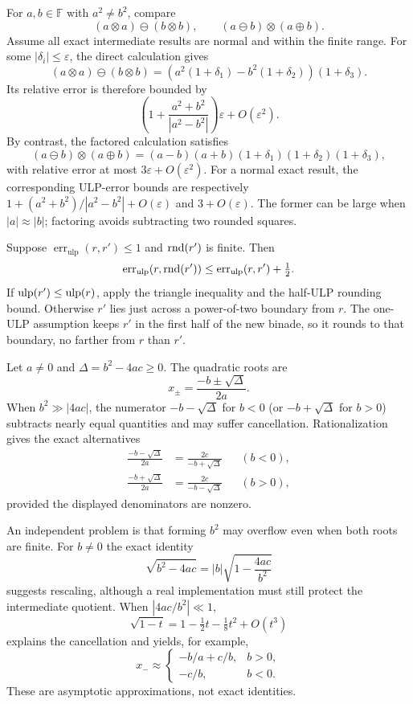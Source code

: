\begin{example}
For $a, b\in\mathbb F$ with $a^2\ne b^2$, compare
\[
 (a\otimes a)\ominus(b\otimes b),
 \qquad (a\ominus b)\otimes(a\oplus b).
\]
Assume all exact intermediate results are normal and within the
finite range. For some $|\delta_i|\le\varepsilon$, the direct
calculation gives
\[
 (a\otimes a)\ominus(b\otimes b)
 =(a^2(1+\delta_1)-b^2(1+\delta_2))(1+\delta_3).
\]
Its relative error is therefore bounded by
\[
 \left(1+\frac{a^2+b^2}{|a^2-b^2|}\right)\varepsilon
 +O(\varepsilon^2).
\]
By contrast, the factored calculation satisfies
\[
 (a\ominus b)\otimes(a\oplus b)
 =(a-b)(a+b)(1+\delta_1)(1+\delta_2)(1+\delta_3),
\]
with relative error at most $3\varepsilon+O(\varepsilon^2)$.
For a normal exact result, the corresponding ULP-error bounds
are respectively $1+(a^2+b^2)/|a^2-b^2|+O(\varepsilon)$
and $3+O(\varepsilon)$. The former can be large when
$|a|\approx|b|$; factoring avoids subtracting two rounded squares.
\end{example}

\begin{remark}
Suppose $\operatorname{err}_{\mathrm{ulp}}(r, r')\le1$
and $\operatorname{rnd}(r')$ is finite. Then
\[
 \operatorname{err}_{\mathrm{ulp}}(r, \operatorname{rnd}(r'))
 \le\operatorname{err}_{\mathrm{ulp}}(r, r')+\tfrac12.
\]
If $\operatorname{ulp}(r')\le\operatorname{ulp}(r)$, apply the triangle inequality and the
half-ULP rounding bound. Otherwise $r'$ lies just across a
power-of-two boundary from $r$. The one-ULP assumption keeps
$r'$ in the first half of the new binade, so it rounds to that
boundary, no farther from $r$ than $r'$.
\end{remark}

\begin{example}
Let $a\ne0$ and $\Delta=b^2-4ac\ge0$. The quadratic roots are
\[
 x_{\pm}=\frac{-b\pm\sqrt\Delta}{2a}.
\]
When $b^2\gg|4ac|$, the numerator $-b-\sqrt\Delta$
for $b<0$ (or $-b+\sqrt\Delta$ for $b>0$) subtracts
nearly equal quantities and may suffer cancellation.
Rationalization gives the exact alternatives
\[
 \begin{aligned}
 \frac{-b-\sqrt\Delta}{2a}&=\frac{2c}{-b+\sqrt\Delta}
   &&(b<0), \\
 \frac{-b+\sqrt\Delta}{2a}&=\frac{2c}{-b-\sqrt\Delta}
   &&(b>0),
 \end{aligned}
\]
provided the displayed denominators are nonzero.

An independent problem is that forming $b^2$ may overflow even
when both roots are finite. For $b\ne0$ the exact identity
\[
 \sqrt{b^2-4ac}=|b|\sqrt{1-\frac{4ac}{b^2}}
\]
suggests rescaling, although a real implementation must still
protect the intermediate quotient. When $|4ac/b^2|\ll1$,
\[
 \sqrt{1-t}=1-\tfrac12t-\tfrac18t^2+O(t^3)
\]
explains the cancellation and yields, for example,
\[
 x_-\approx
 \begin{cases}
 -b/a+c/b, &b>0, \\
 -c/b, &b<0.
 \end{cases}
\]
These are asymptotic approximations, not exact identities.
\end{example}

